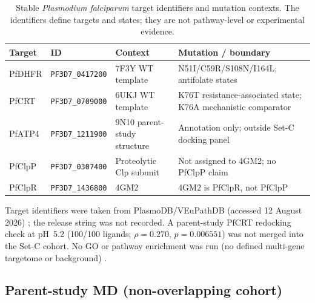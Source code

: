 \documentclass[journal=jcisd8,manuscript=suppinfo,layout=traditional]{achemso}
\begin{document}
\begin{table}[htbp]
\centering
\scriptsize
\setlength{\tabcolsep}{0pt}
\caption{Stable \textit{Plasmodium falciparum} target identifiers and mutation contexts. The identifiers define targets and states; they are not pathway-level or experimental evidence.}
\label{tab:s5_plasmodb}
\begin{tabularx}{\textwidth}{>{\raggedright\arraybackslash}p{} >{\raggedright\arraybackslash}p{} >{\raggedright\arraybackslash}p{} X}
\toprule
Target & ID & Context & Mutation / boundary \\
\midrule
PfDHFR & \scriptsize\texttt{PF3D7\_0417200}\normalsize & 7F3Y WT template & N51I/C59R/S108N/I164L; antifolate states \\
PfCRT & \scriptsize\texttt{PF3D7\_0709000}\normalsize & 6UKJ WT template & K76T resistance-associated state; K76A mechanistic comparator \\
PfATP4 & \scriptsize\texttt{PF3D7\_1211900}\normalsize & 9N10 parent-study structure & Annotation only; outside Set-C docking panel \\
PfClpP & \scriptsize\texttt{PF3D7\_0307400}\normalsize & Proteolytic Clp subunit & Not assigned to 4GM2; no PfClpP claim \\
PfClpR & \scriptsize\texttt{PF3D7\_1436800}\normalsize & 4GM2 & 4GM2 is PfClpR, not PfClpP \\
\bottomrule
\end{tabularx}
\normalsize
\setlength{\tabcolsep}{6pt}
\end{table}

Target identifiers were taken from PlasmoDB/VEuPathDB (accessed 12 August 2026) \citep{plasmodb_2026}; the release string was not recorded. A parent-study PfCRT redocking check at pH~\num{5.2} (100/100 ligands; $\rho = 0.270$, $p = 0.006551$) was not merged into the Set-C cohort. No GO or pathway enrichment was run (no defined multi-gene targetome or background) \citep{Trapotsi2022MoA}.


\subsection*{Parent-study MD (non-overlapping cohort)}
\end{document}
